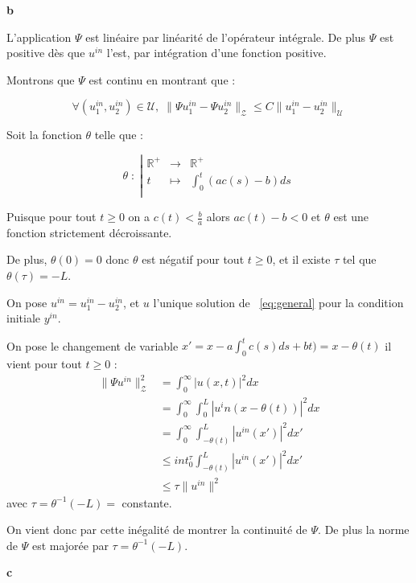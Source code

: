 \documentclass[a4paper]{article}
\newcommand{\Y}{\mathscr{U}}
\newcommand{\Z}{\mathscr{Z}}
\begin{document}
\textbf{b}

L'application $\Psi$ est linéaire par linéarité de l'opérateur intégrale.
De plus $\Psi $ est positive dès que $u^{in}$ l'est, par intégration d'une fonction positive.

Montrons que $\Psi$ est continu en montrant que :

\[ \forall (u_1^{in}, u_2^{in}) \in \Y, \; \| \Psi u_1^{in} - \Psi u_2^{in} \|_{\Z} \leq  C \| u_1^{in} - u_2^{in} \|_{\Y}\]

Soit la fonction $\theta$ telle que :

\[\theta \; : \; \left\vert
	\begin{array}{ccc}
	\mathbb{R}^+ & \to & \mathbb{R}^+\\
	t & \mapsto & \int_0^t (ac(s)-b)ds \\
	\end{array} \right.
\]

Puisque pour tout $t \geq 0 $ on a $c(t)< \frac{b}{a}$ alors $ac(t)-b<0$ et $\theta$ est une fonction strictement décroissante.

De plus, $\theta (0) =0$ donc $\theta$ est négatif pour tout $t \geq 0$,
et il existe $\tau$ tel que $\theta(\tau) = - L$.

On pose $u^{in} = u_1^{in} - u_2^{in}$, et $u$ l'unique solution de ~\eqref{eq:general} pour la condition initiale $y^{in}$.

On pose le changement de variable $x'=x - a\int_0^tc(s)ds + bt) = x - \theta (t)$ il vient pour tout $t \geq 0$ :
\[ \begin{split}
\|\Psi u^{in}\|_{\Z}^2 &= \int_0^\infty |u(x,t)|^2 dx \\
			   &= \int_0^\infty \int_0^L |u^in( x - \theta(t))|^2 dx \\
			   &= \int_0^\infty \int_{-\theta(t)}^{L} |u^{in}(x')|^2 dx' \\
			   & \leq int_0^\tau \int_{-\theta(t)}^L |u^{in}(x')|^2 dx'\\
			   & \leq \tau \| u^{in} \|^2
\end{split}\]
avec $\tau = \theta ^{-1}(-L) =$ constante.

On vient donc par cette inégalité de montrer la continuité de $\Psi$. De plus la norme de $\Psi$ est majorée par $\tau = \theta ^{-1}(-L)$.

\textbf{c}


	
\end{document}
